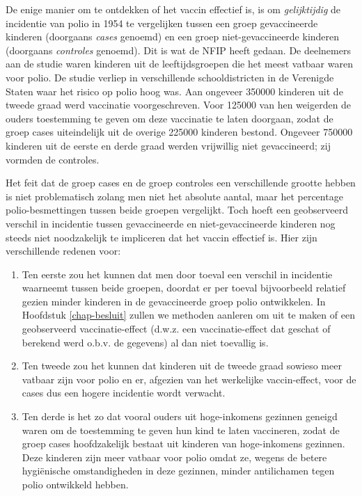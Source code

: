 \documentclass[
  12pt,dutch,coursenotes]{book}
\providecommand{\tightlist}{%
  \setlength{\itemsep}{0pt}\setlength{\parskip}{0pt}}
\theoremstyle{definition}
\theoremstyle{definition}
\theoremstyle{definition}
\theoremstyle{definition}
\theoremstyle{remark}
\begin{document}
De enige manier om te ontdekken of het vaccin effectief is, is om \emph{gelijktijdig} de incidentie van polio in 1954 te vergelijken tussen een
groep gevaccineerde kinderen (doorgaans \emph{cases} genoemd) en een groep
niet-gevaccineerde kinderen (doorgaans \emph{controles} genoemd). Dit is
wat de NFIP heeft gedaan. De deelnemers aan de studie waren kinderen uit de
leeftijdsgroepen die het meest vatbaar waren voor polio. De studie verliep in
verschillende schooldistricten in de Verenigde Staten waar het risico op
polio hoog was. Aan ongeveer 350000 kinderen uit de tweede graad werd
vaccinatie voorgeschreven. Voor 125000 van hen weigerden de ouders
toestemming te geven om deze vaccinatie te laten doorgaan, zodat de groep
cases uiteindelijk uit de overige 225000 kinderen bestond. Ongeveer
750000 kinderen uit de eerste en derde graad werden vrijwillig niet
gevaccineerd; zij vormden de controles.

Het feit dat de groep cases en de groep controles een verschillende grootte
hebben is niet problematisch zolang men niet het absolute aantal, maar het
percentage polio-besmettingen tussen beide groepen vergelijkt. Toch hoeft
een geobserveerd verschil in incidentie tussen gevaccineerde en
niet-gevaccineerde kinderen nog steeds niet noodzakelijk te impliceren dat
het vaccin effectief is. Hier zijn verschillende redenen voor:

\begin{enumerate}
\def\labelenumi{\arabic{enumi}.}
\tightlist
\item
  Ten eerste zou het kunnen dat men door toeval een verschil in
  incidentie waarneemt tussen beide groepen, doordat er per toeval
  bijvoorbeeld relatief gezien minder kinderen in de gevaccineerde groep polio
  ontwikkelen. In Hoofdstuk \ref{chap-besluit} zullen we methoden aanleren om
  uit te maken of een geobserveerd vaccinatie-effect (d.w.z. een
  vaccinatie-effect dat geschat of berekend werd o.b.v. de gegevens) al dan
  niet toevallig is.
\item
  Ten tweede zou het kunnen dat kinderen uit de tweede graad sowieso
  meer vatbaar zijn voor polio en er, afgezien van het werkelijke
  vaccin-effect, voor de cases dus een hogere incidentie wordt verwacht.
\item
  Ten derde is het zo dat vooral ouders uit hoge-inkomens gezinnen
  geneigd waren om de toestemming te geven hun kind te laten vaccineren, zodat
  de groep cases hoofdzakelijk bestaat uit kinderen van hoge-inkomens
  gezinnen. Deze kinderen zijn meer vatbaar voor polio omdat ze, wegens de
  betere hygiënische omstandigheden in deze gezinnen, minder antilichamen
  tegen polio ontwikkeld hebben.
\end{enumerate}
\end{document}
